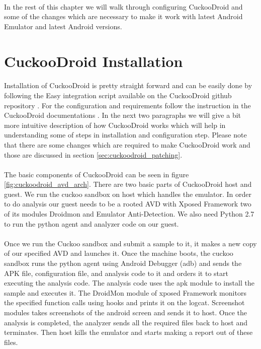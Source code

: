 \documentclass[../main.tex]{subfile}
\begin{document}
		\paragraph{} In the rest of this chapter we will walk through configuring CuckooDroid and some of the changes which are necessary to make it work with latest Android Emulator and latest Android versions.
		\section{CuckooDroid Installation}\label{sec:cuckoodroid_installation}
		\paragraph{} Installation of CuckooDroid is pretty straight forward and can be easily done by following the Easy integration script available on the CuckooDroid github repository \cite{cuckoodroid_github}. For the configuration and requirements follow the instruction in the CuckooDroid documentations \cite{cuckoodroid_docs}. In the next two paragraphs we will give a bit more intuitive description of how CuckooDroid works which will help in understanding some of steps in installation and configuration step. Please note that there are some changes which are required to make CuckooDroid work and those are discussed in section \ref{sec:cuckoodroid_patching}.
		\paragraph{} The basic components of CuckooDroid can be seen in figure \ref{fig:cuckoodroid_avd_arch}. There are two basic parts of CuckooDroid host and guest. We run the cuckoo sandbox on host which handles the emulator. In order to do analysis our guest needs to be a rooted AVD with Xposed Framework \cite{xposed_module_repo} two of its modules Droidmon and Emulator Anti-Detection. We also need Python 2.7 to run the python agent and analyzer code on our guest.
		\paragraph{} Once we run the Cuckoo sandbox and submit a sample to it, it makes a new copy of our specified AVD and launches it. Once the machine boots, the cuckoo sandbox runs the python agent using Android Debugger (adb) and sends the APK file, configuration file, and analysis code to it and orders it to start executing the analysis code. The analysis code uses the apk module to install the sample and executes it. The DroidMon module of xposed Framework monitors the specified function calls using hooks and prints it on the logcat. Screenshot modules takes screenshots of the android screen and sends it to host. Once the analysis is completed, the analyzer sends all the required files back to host and terminates. Then host kills the emulator and starts making a report out of these files.
\end{document}

